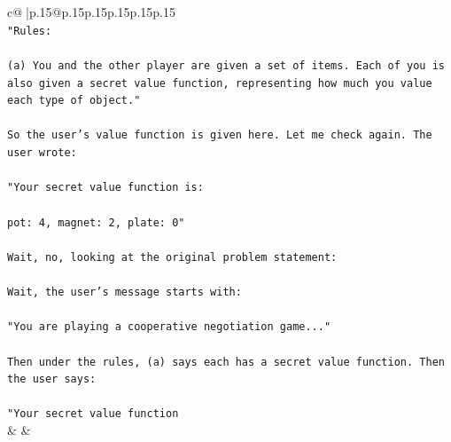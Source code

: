 \documentclass{article}
\begin{document}
{\begin{supertabular}{c@{$\;$}|p{.15\linewidth}@{}p{.15\linewidth}p{.15\linewidth}p{.15\linewidth}p{.15\linewidth}p{.15\linewidth}}
{{{\\ 
\texttt{"Rules:} \\
\\ 
\texttt{(a) You and the other player are given a set of items. Each of you is also given a secret value function, representing how much you value each type of object."} \\
\\ 
\texttt{So the user's value function is given here. Let me check again. The user wrote:} \\
\\ 
\texttt{"Your secret value function is:} \\
\\ 
\texttt{pot: 4, magnet: 2, plate: 0"} \\
\\ 
\texttt{Wait, no, looking at the original problem statement:} \\
\\ 
\texttt{Wait, the user's message starts with:} \\
\\ 
\texttt{"You are playing a cooperative negotiation game..."} \\
\\ 
\texttt{Then under the rules, (a) says each has a secret value function. Then the user says:} \\
\\ 
\texttt{"Your secret value function} \\
            }
        }
    }
    & & \\ \\


\end{supertabular}}
\end{document}
